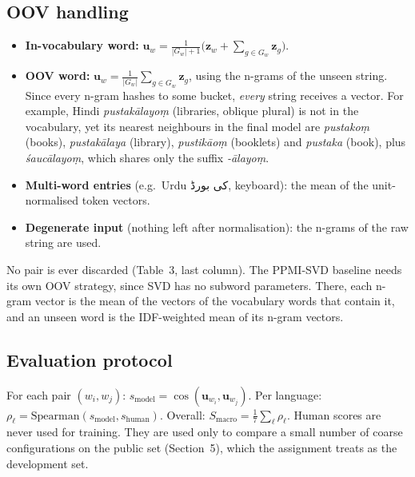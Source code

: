 \documentclass[11pt,a4paper]{article}
\begin{document}
\subsection{OOV handling}
\begin{itemize}\setlength{\itemsep}{1pt}
\item \textbf{In-vocabulary word:} $\mathbf{u}_w = \frac{1}{|G_w|+1}\big(\mathbf{z}_w + \sum_{g\in G_w}\mathbf{z}_g\big)$.
\item \textbf{OOV word:} $\mathbf{u}_w = \frac{1}{|G_w|}\sum_{g\in G_w}\mathbf{z}_g$, using the n-grams of the unseen string. Since every n-gram hashes to some bucket, \emph{every} string receives a vector. For example, Hindi \textit{pustakālayoṃ} (libraries, oblique plural) is not in the vocabulary, yet its nearest neighbours in the final model are \textit{pustakoṃ} (books), \textit{pustakālaya} (library), \textit{pustikāoṃ} (booklets) and \textit{pustaka} (book), plus \textit{śaucālayoṃ}, which shares only the suffix \textit{-ālayoṃ}.
\item \textbf{Multi-word entries} (e.g.\ Urdu {\urd\beginR کی بورڈ\endR}, keyboard): the mean of the unit-normalised token vectors.
\item \textbf{Degenerate input} (nothing left after normalisation): the n-grams of the raw string are used.
\end{itemize}
No pair is ever discarded (Table~3, last column). The PPMI-SVD baseline needs its own OOV strategy, since SVD has no subword parameters. There, each n-gram vector is the mean of the vectors of the vocabulary words that contain it, and an unseen word is the IDF-weighted mean of its n-gram vectors.

\subsection{Evaluation protocol}
For each pair $(w_i,w_j)$: $s_{\text{model}}=\cos(\mathbf{u}_{w_i},\mathbf{u}_{w_j})$. Per language: $\rho_\ell=\text{Spearman}(s_{\text{model}},s_{\text{human}})$. Overall: $S_{\text{macro}}=\frac{1}{7}\sum_\ell\rho_\ell$. Human scores are never used for training. They are used only to compare a small number of coarse configurations on the public set (Section~5), which the assignment treats as the development set.
\end{document}
